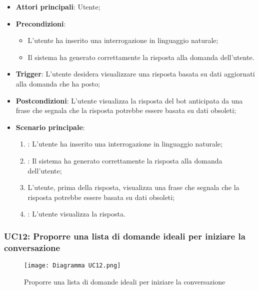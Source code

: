 \begin{itemize}
    \item \textbf{Attori principali}: Utente;
    \item \textbf{Precondizioni}: 
    \begin{itemize}
        \item L'utente ha inserito una interrogazione in linguaggio naturale;
        \item Il sistema ha generato correttamente la risposta alla domanda dell'utente.
    \end{itemize}
    \item \textbf{Trigger}: L'utente desidera visualizzare una risposta basata su dati aggiornati alla domanda che ha posto;
    \item \textbf{Postcondizioni}: L'utente visualizza la risposta del bot anticipata da una frase che segnala che la
    risposta potrebbe essere basata su dati obsoleti;
    \item \textbf{Scenario principale}: 
    \begin{enumerate}
        \item {}: L'utente ha inserito una interrogazione in linguaggio naturale;
        \item {}: Il sistema ha generato correttamente la risposta alla domanda dell'utente;
        \item L'utente, prima della risposta, visualizza una frase che segnala che la risposta potrebbe essere basata su dati obsoleti;
        \item {}: L'utente visualizza la risposta.
    \end{enumerate}
\end{itemize}



\hypertarget{UC12}{}
\subsubsection{UC12: Proporre una lista di domande ideali per iniziare la conversazione}

\begin{figure}[h]
    \centering
    \texttt{[image: Diagramma UC12.png]}
    \caption{Proporre una lista di domande ideali per iniziare la conversazione}
\end{figure}

